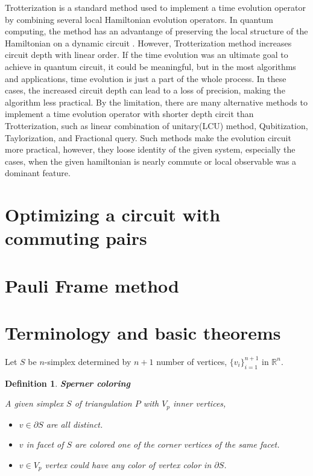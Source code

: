 \documentclass[a4paper,12pt]{article}
\newtheorem{definition}{Definition}
\begin{document}
Trotterization is a standard method used to implement a time evolution operator 
by combining several local Hamiltonian evolution operators.
In quantum computing, the method has an advantange of preserving the local structure of 
the Hamiltonian on a dynamic circuit \cite{childs_theory_2021}.
However, Trotterization method increases circuit depth with linear order.
If the time evolution was an ultimate goal to achieve in quantum circuit, 
it could be meaningful, but in the most algorithms and applications, time evolution 
is just a part of the whole process. 
In these cases, the increased circuit depth can lead to a loss of precision, making the algorithm less practical.
By the limitation, there are many alternative methods to implement a time evolution operator 
with shorter depth circit than Trotterization, such as 
linear combination of unitary(LCU) method\cite{dewolf2023quantumcomputinglecturenotes}, Qubitization\cite{Low_2019}, 
Taylorization\cite{PhysRevLett.114.090502}, and Fractional query\cite{Berry_2014}.
Such methods make the evolution circuit more practical, however, they loose 
identity of the given system, especially the cases, when the given hamiltonian is nearly commute
or local observable was a dominant feature\cite{childs_theory_2021}. 


\section{Optimizing a circuit with commuting pairs}

\section{Pauli Frame method}

\section{}

\section{Terminology and basic theorems}

Let $S$ be $n$-simplex determined by $n+1$ number of vertices, $\{v_i\}_{i=1}^{n+1}$ in $\mathbb{R}^n$.
\begin{definition}\textbf{Sperner coloring}

    A given simplex $S$ of triangulation $P$ with $V_p$ inner vertices,
    \begin{itemize}
        \item $v \in \partial S$ are all distinct.
        \item $v$ in facet of $S$ are colored one of the corner vertices of the same facet.
        \item $v \in V_p$ vertex could have any color of vertex color in $\partial S$.
    \end{itemize}
\end{definition}
\end{document}

